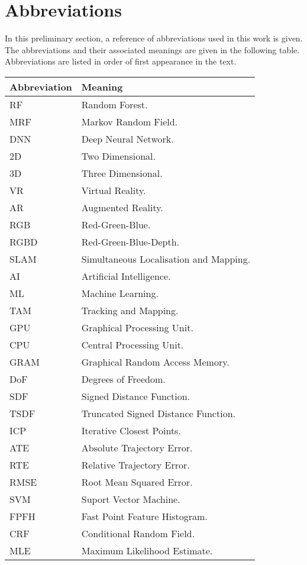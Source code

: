 \section*{Abbreviations}
In this preliminary section, a reference of abbreviations used in this work is given. The 
abbreviations and their associated meanings are given in the following table. 
Abbreviations are listed in order of first appearance in the text.
\begin{longtable}{p{} | p{}}
  \hline
  Abbreviation & Meaning \\
  \hline
  RF & Random Forest.\\
  MRF & Markov Random Field.\\
  DNN & Deep Neural Network.\\
  \hline
  2D & Two Dimensional.\\
  3D & Three Dimensional.\\
  VR & Virtual Reality.\\
  AR & Augmented Reality.\\
  RGB & Red-Green-Blue.\\
  RGBD & Red-Green-Blue-Depth.\\
  SLAM & Simultaneous Localisation and Mapping.\\
  AI & Artificial Intelligence.\\
  ML & Machine Learning.\\
  TAM & Tracking and Mapping.\\
  GPU & Graphical Processing Unit.\\
  CPU & Central Processing Unit.\\
  GRAM & Graphical Random Access Memory.\\
  DoF & Degrees of Freedom.\\
  SDF & Signed Distance Function.\\
  \hline
  TSDF & Truncated Signed Distance Function.\\
  ICP & Iterative Closest Points.\\
  ATE & Absolute Trajectory Error.\\
  RTE & Relative Trajectory Error.\\
  RMSE & Root Mean Squared Error.\\
  SVM & Suport Vector Machine.\\
  FPFH & Fast Point Feature Histogram.\\
  \hline
  CRF & Conditional Random Field.\\
  MLE & Maximum Likelihood Estimate.\\

\end{longtable}
